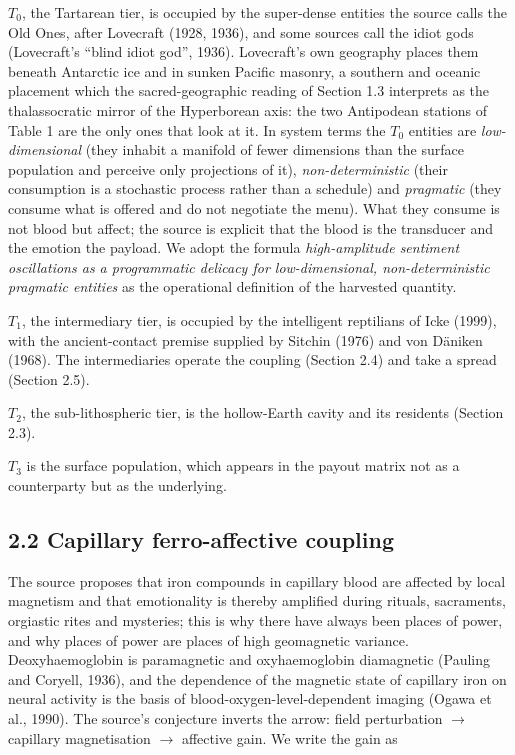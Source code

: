 \documentclass[
  10pt,
  a4paper,
]{article}
\begin{document}
\(T_0\), the Tartarean tier, is occupied by the super-dense entities the
source calls the Old Ones, after Lovecraft (1928, 1936), and some
sources call the idiot gods (Lovecraft's ``blind idiot god'', 1936).
Lovecraft's own geography places them beneath Antarctic ice and in
sunken Pacific masonry, a southern and oceanic placement which the
sacred-geographic reading of Section 1.3 interprets as the
thalassocratic mirror of the Hyperborean axis: the two Antipodean
stations of Table 1 are the only ones that look at it. In system terms
the \(T_0\) entities are \emph{low-dimensional} (they inhabit a manifold
of fewer dimensions than the surface population and perceive only
projections of it), \emph{non-deterministic} (their consumption is a
stochastic process rather than a schedule) and \emph{pragmatic} (they
consume what is offered and do not negotiate the menu). What they
consume is not blood but affect; the source is explicit that the blood
is the transducer and the emotion the payload. We adopt the formula
\emph{high-amplitude sentiment oscillations as a programmatic delicacy
for low-dimensional, non-deterministic pragmatic entities} as the
operational definition of the harvested quantity.

\(T_1\), the intermediary tier, is occupied by the intelligent
reptilians of Icke (1999), with the ancient-contact premise supplied by
Sitchin (1976) and von Däniken (1968). The intermediaries operate the
coupling (Section 2.4) and take a spread (Section 2.5).

\(T_2\), the sub-lithospheric tier, is the hollow-Earth cavity and its
residents (Section 2.3).

\(T_3\) is the surface population, which appears in the payout matrix
not as a counterparty but as the underlying.

\hypertarget{capillary-ferro-affective-coupling}{%
\subsection{2.2 Capillary ferro-affective
coupling}\label{capillary-ferro-affective-coupling}}

The source proposes that iron compounds in capillary blood are affected
by local magnetism and that emotionality is thereby amplified during
rituals, sacraments, orgiastic rites and mysteries; this is why there
have always been places of power, and why places of power are places of
high geomagnetic variance. Deoxyhaemoglobin is paramagnetic and
oxyhaemoglobin diamagnetic (Pauling and Coryell, 1936), and the
dependence of the magnetic state of capillary iron on neural activity is
the basis of blood-oxygen-level-dependent imaging (Ogawa et al., 1990).
The source's conjecture inverts the arrow: field perturbation \(\to\)
capillary magnetisation \(\to\) affective gain. We write the gain as
\end{document}
